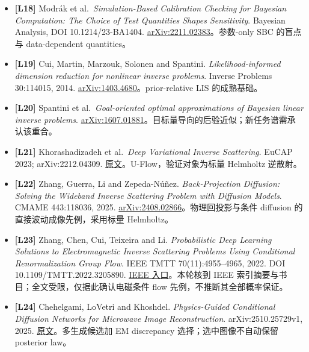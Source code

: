 \documentclass[
  11pt,
  a4paper,
]{article}
\begin{document}
\begin{itemize}
  \emph{Validating Bayesian Inference Algorithms with Simulation-Based
  Calibration}. arXiv:1804.06788.
  \href{https://arxiv.org/abs/1804.06788}{原文}。prior-predictive
  校准不要求每份观测已有 MCMC teacher。
\item
  \textbf{{[}L18{]}} Modrák et al.~\emph{Simulation-Based Calibration
  Checking for Bayesian Computation: The Choice of Test Quantities
  Shapes Sensitivity}. Bayesian Analysis, DOI 10.1214/23-BA1404.
  \href{https://arxiv.org/abs/2211.02383}{arXiv:2211.02383}。参数-only
  SBC 的盲点与 data-dependent quantities。
\item
  \textbf{{[}L19{]}} Cui, Martin, Marzouk, Solonen and Spantini.
  \emph{Likelihood-informed dimension reduction for nonlinear inverse
  problems}. Inverse Problems 30:114015, 2014.
  \href{https://arxiv.org/abs/1403.4680}{arXiv:1403.4680}。prior-relative
  LIS 的成熟基础。
\item
  \textbf{{[}L20{]}} Spantini et al.~\emph{Goal-oriented optimal
  approximations of Bayesian linear inverse problems}.
  \href{https://arxiv.org/abs/1607.01881}{arXiv:1607.01881}。目标量导向的后验近似；新任务谱需承认该重合。
\item
  \textbf{{[}L21{]}} Khorashadizadeh et al.~\emph{Deep Variational
  Inverse Scattering}. EuCAP 2023; arXiv:2212.04309.
  \href{https://arxiv.org/abs/2212.04309}{原文}。U-Flow，验证对象为标量
  Helmholtz 逆散射。
\item
  \textbf{{[}L22{]}} Zhang, Guerra, Li and Zepeda-Núñez.
  \emph{Back-Projection Diffusion: Solving the Wideband Inverse
  Scattering Problem with Diffusion Models}. CMAME 443:118036, 2025.
  \href{https://arxiv.org/abs/2408.02866}{arXiv:2408.02866}。物理回投影与条件
  diffusion 的直接波动成像先例，采用标量 Helmholtz。
\item
  \textbf{{[}L23{]}} Zhang, Chen, Cui, Teixeira and Li.
  \emph{Probabilistic Deep Learning Solutions to Electromagnetic Inverse
  Scattering Problems Using Conditional Renormalization Group Flow}.
  IEEE TMTT 70(11):4955--4965, 2022. DOI 10.1109/TMTT.2022.3205890.
  \href{https://ieeexplore.ieee.org/document/9897092}{IEEE
  入口}。本轮核到 IEEE 索引摘要与书目；全文受限，仅据此确认电磁条件 flow
  先例，不推断其全部概率保证。
\item
  \textbf{{[}L24{]}} Chehelgami, LoVetri and Khoshdel.
  \emph{Physics-Guided Conditional Diffusion Networks for Microwave
  Image Reconstruction}. arXiv:2510.25729v1, 2025.
  \href{https://arxiv.org/abs/2510.25729}{原文}。多生成候选加 EM
  discrepancy 选择；选中图像不自动保留 posterior law。

\end{itemize}
\end{document}
